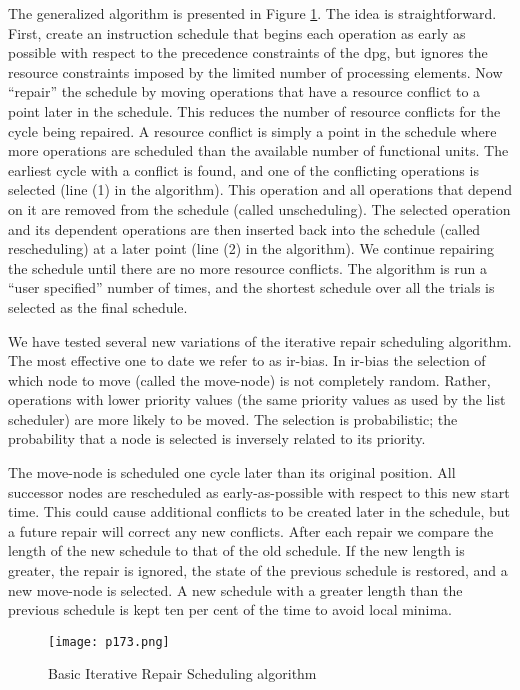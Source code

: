 The generalized algorithm is presented in Figure \ref{fig:p173}. The idea is straightforward. First, create an instruction
schedule that begins each operation as early as possible with respect to the precedence constraints of the dpg,
but ignores the resource constraints imposed by the limited number of processing elements. Now “repair” the
schedule by moving operations that have a resource conflict to a point later in the schedule. This reduces the
number of resource conflicts for the cycle being repaired. A resource conflict is simply a point in the schedule
where more operations are scheduled than the available number of functional units. The earliest cycle with a
conflict is found, and one of the conflicting operations is selected (line (1) in the algorithm). This operation
and all operations that depend on it are removed from the schedule (called unscheduling). The selected
operation and its dependent operations are then inserted back into the schedule (called rescheduling) at a
later point (line (2) in the algorithm). We continue repairing the schedule until there are no more resource
conflicts. The algorithm is run a “user specified” number of times, and the shortest schedule over all the
trials is selected as the final schedule.

We have tested several new variations of the iterative repair scheduling algorithm. The most effective
one to date we refer to as ir-bias. In ir-bias the selection of which node to move (called the move-node) is
not completely random. Rather, operations with lower priority values (the same priority values as used by
the list scheduler) are more likely to be moved. The selection is probabilistic; the probability that a node is
selected is inversely related to its priority.

The move-node is scheduled one cycle later than its original position. All successor nodes are rescheduled
as early-as-possible with respect to this new start time. This could cause additional conflicts to be created
later in the schedule, but a future repair will correct any new conflicts. After each repair we compare the
length of the new schedule to that of the old schedule. If the new length is greater, the repair is ignored,
the state of the previous schedule is restored, and a new move-node is selected. A new schedule with a
greater length than the previous schedule is kept ten per cent of the time to avoid local minima. 
\begin{figure}[H]
	\centering
	\texttt{[image: p173.png]}
	\caption{Basic Iterative Repair Scheduling algorithm}
	\label{fig:p173}
\end{figure}
